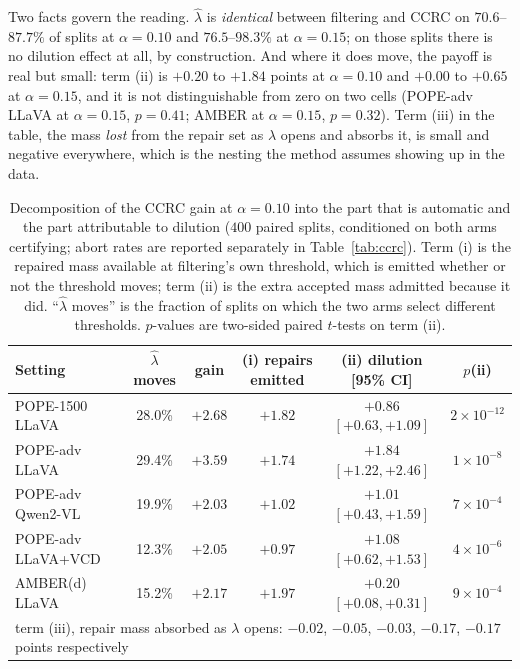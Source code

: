\documentclass{article}
\theoremstyle{plain}
\theoremstyle{definition}
\theoremstyle{remark}
\begin{document}
Two facts govern the reading. $\hat\lambda$ is \emph{identical} between filtering and CCRC on
$70.6$--$87.7\%$ of splits at $\alpha=0.10$ and $76.5$--$98.3\%$ at $\alpha=0.15$; on those
splits there is no dilution effect at all, by construction. And where it does move, the payoff
is real but small: term (ii) is $+0.20$ to $+1.84$ points at $\alpha=0.10$ and $+0.00$ to
$+0.65$ at $\alpha=0.15$, and it is not distinguishable from zero on two cells (POPE-adv LLaVA
at $\alpha=0.15$, $p=0.41$; AMBER at $\alpha=0.15$, $p=0.32$). Term (iii) in the table, the
mass \emph{lost} from the repair set as $\lambda$ opens and absorbs it, is small and negative
everywhere, which is the nesting the method assumes showing up in the data.

\begin{table}[t]
\centering
\caption{Decomposition of the CCRC gain at $\alpha=0.10$ into the part that is automatic and the
part attributable to dilution ($400$ paired splits, conditioned on both arms certifying;
abort rates are reported separately in Table~\ref{tab:ccrc}). Term (i) is the repaired mass
available at filtering's own threshold, which is emitted whether or not the threshold moves;
term (ii) is the extra accepted mass admitted because it did. ``$\hat\lambda$ moves'' is the
fraction of splits on which the two arms select different thresholds. $p$-values are two-sided
paired $t$-tests on term (ii).}
\label{tab:dilution}
\small
\begin{tabular}{lccccc}
\toprule
Setting & $\hat\lambda$ moves & gain & (i) repairs emitted & (ii) dilution [95\% CI] & $p$(ii)\\
\midrule
POPE-1500 LLaVA    & 28.0\% & $+2.68$ & $+1.82$ & $+0.86$ $[+0.63,+1.09]$ & $2\!\times\!10^{-12}$\\
POPE-adv LLaVA     & 29.4\% & $+3.59$ & $+1.74$ & $+1.84$ $[+1.22,+2.46]$ & $1\!\times\!10^{-8}$\\
POPE-adv Qwen2-VL  & 19.9\% & $+2.03$ & $+1.02$ & $+1.01$ $[+0.43,+1.59]$ & $7\!\times\!10^{-4}$\\
POPE-adv LLaVA+VCD & 12.3\% & $+2.05$ & $+0.97$ & $+1.08$ $[+0.62,+1.53]$ & $4\!\times\!10^{-6}$\\
AMBER(d) LLaVA     & 15.2\% & $+2.17$ & $+1.97$ & $+0.20$ $[+0.08,+0.31]$ & $9\!\times\!10^{-4}$\\
\midrule
\multicolumn{6}{l}{term (iii), repair mass absorbed as $\lambda$ opens: $-0.02$, $-0.05$,
$-0.03$, $-0.17$, $-0.17$ points respectively}\\
\bottomrule
\end{tabular}
\end{table}
\end{document}
